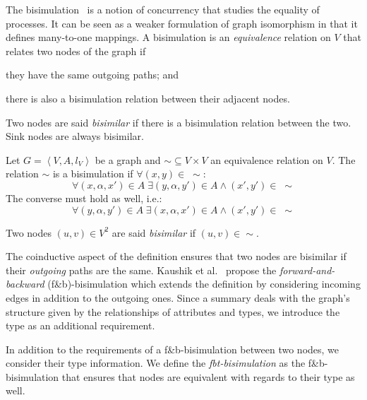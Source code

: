 The bisimulation~\cite{park:1981:cai} is a notion of concurrency that studies the equality of processes. It can be seen as a weaker formulation of graph isomorphism in that it defines many-to-one mappings. A bisimulation is an \emph{equivalence} relation on $V$ that relates two nodes of the graph if
\begin{inparaenum}[(a)]
	\item they have the same outgoing paths; and
	\item there is also a bisimulation relation between their adjacent nodes.
\end{inparaenum}
Two nodes are said \emph{bisimilar} if there is a bisimulation relation between the two. Sink nodes are always bisimilar.

\begin{definition}[Bisimulation]
Let $G=\left\langle V, A, l_V \right\rangle$ be a graph and $\sim \subseteq V \times V$ an equivalence relation on $V$.
The relation $\sim$ is a bisimulation if $\forall (x,y) \in\; \sim$:
\begin{equation*}
\forall (x, \alpha, x') \in A\; \exists (y, \alpha, y') \in A \wedge (x',y') \in\; \sim
\label{eq:b1}
\end{equation*}
The converse must hold as well, i.e.:
\begin{equation*}
\forall (y, \alpha, y') \in A\; \exists (x, \alpha, x') \in A \wedge (x',y') \in\; \sim
\label{eq:b2}
\end{equation*}
\end{definition}

\begin{remark}
Two nodes $(u, v) \in V^2$ are said \emph{bisimilar} if $(u, v) \in \sim$.
\end{remark}

The coinductive aspect of the definition ensures that two nodes are bisimilar if their \emph{outgoing} paths are the same. Kaushik et al.~\cite{kaushik:2002:cib} propose the \emph{forward-and-backward} (f\&b)-bisimulation which extends the definition by considering incoming edges in addition to the outgoing ones. Since a summary deals with the graph's structure given by the relationships of attributes and types, we introduce the type as an additional requirement.

In addition to the requirements of a f\&b-bisimulation between two nodes, we consider their type information. We define the \emph{fbt-bisimulation} as the f\&b-bisimulation that ensures that nodes are equivalent with regards to their type as well.

